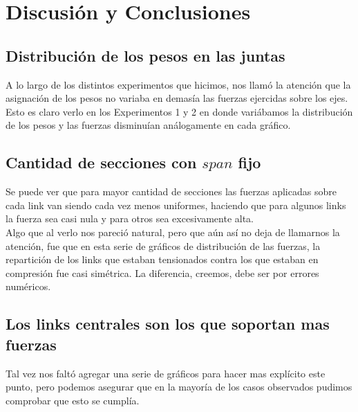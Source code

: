 \section{Discusión y Conclusiones}

\subsection{Distribución de los pesos en las juntas}

A lo largo de los distintos experimentos que hicimos, nos llamó la atención que la asignación de los pesos no variaba en demasía las fuerzas ejercidas sobre los ejes.\\

Esto es claro verlo en los Experimentos 1 y 2 en donde variábamos la distribución de los pesos y las fuerzas disminuían análogamente en cada gráfico.

\subsection{Cantidad de secciones con $span$ fijo}

Se puede ver que para mayor cantidad de secciones las fuerzas aplicadas sobre cada link van siendo cada vez menos uniformes, haciendo que para algunos links la fuerza sea casi nula y para otros sea excesivamente alta.\\

Algo que al verlo nos pareció natural, pero que aún así no deja de llamarnos la atención, fue que en esta serie de gráficos de distribución de las fuerzas, la repartición de los links que estaban tensionados contra los que estaban en compresión fue casi simétrica. La diferencia, creemos, debe ser por errores numéricos.

\subsection{Los links centrales son los que soportan mas fuerzas}

Tal vez nos faltó agregar una serie de gráficos para hacer mas explícito este punto, pero podemos asegurar que en la mayoría de los casos observados pudimos comprobar que esto se cumplía.